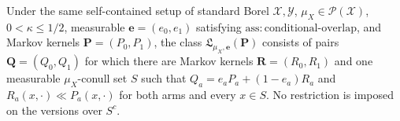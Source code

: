 Under the same self-contained setup of standard Borel \(\mathcal X,\mathcal Y\), \(\mu_X\in\mathcal P(\mathcal X)\), \(0<\kappa\le1/2\), measurable \(\boldsymbol e=(e_0,e_1)\) satisfying \(\mathrm{ass:conditional\text{-}overlap}\), and Markov kernels \(\boldsymbol P=(P_0,P_1)\), the class \(\mathfrak L_{\mu_X,\boldsymbol e}(\boldsymbol P)\) consists of pairs \(\boldsymbol Q=(Q_0,Q_1)\) for which there are Markov kernels \(\boldsymbol R=(R_0,R_1)\) and one measurable \(\mu_X\)-conull set \(S\) such that \(Q_a=e_aP_a+(1-e_a)R_a\) and \(R_a(x,\cdot)\ll P_a(x,\cdot)\) for both arms and every \(x\in S\).  No restriction is imposed on the versions over \(S^c\).